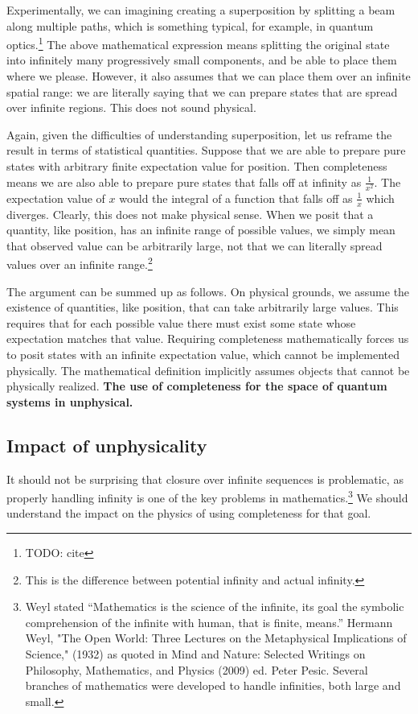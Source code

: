 \documentclass[10pt,twocolumn, nofootinbib]{revtex4-2}
\begin{document}
Experimentally, we can imagining creating a superposition by splitting a beam along multiple paths, which is something typical, for example, in quantum optics.\footnote{TODO: cite} The above mathematical expression means splitting the original state into infinitely many progressively small components, and be able to place them where we please. However, it also assumes that we can place them over an infinite spatial range: we are literally saying that we can prepare states that are spread over infinite regions. This does not sound physical.

Again, given the difficulties of understanding superposition, let us reframe the result in terms of statistical quantities. Suppose that we are able to prepare pure states with arbitrary finite expectation value for position. Then completeness means we are also able to prepare pure states that falls off at infinity as $\frac{1}{x^2}$. The expectation value of $x$ would the integral of a function that falls off as $\frac{1}{x}$ which diverges. Clearly, this does not make physical sense. When we posit that a quantity, like position, has an infinite range of possible values, we simply mean that observed value can be arbitrarily large, not that we can literally spread values over an infinite range.\footnote{This is the difference between potential infinity and actual infinity.}

The argument can be summed up as follows. On physical grounds, we assume the existence of quantities, like position, that can take arbitrarily large values. This requires that for each possible value there must exist some state whose expectation matches that value. Requiring completeness mathematically forces us to posit states with an infinite expectation value, which cannot be implemented physically. The mathematical definition implicitly assumes objects that cannot be physically realized. \textbf{The use of completeness for the space of quantum systems in unphysical.}

\subsection{Impact of unphysicality}

It should not be surprising that closure over infinite sequences is problematic, as properly handling infinity is one of the key problems in mathematics.\footnote{Weyl stated ``Mathematics is the science of the infinite, its goal the symbolic comprehension of the infinite with human, that is finite, means.'' Hermann Weyl, "The Open World: Three Lectures on the Metaphysical Implications of Science," (1932) as quoted in Mind and Nature: Selected Writings on Philosophy, Mathematics, and Physics (2009) ed. Peter Pesic. Several branches of mathematics were developed to handle infinities, both large and small. } We should understand the impact on the physics of using completeness for that goal.
\end{document}
